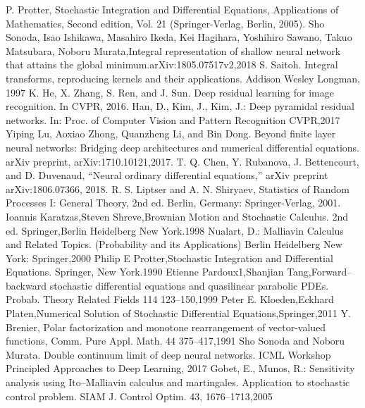 \documentclass{jsarticle}
\begin{document}
\begin{thebibliography}{99}
    P. Protter, Stochastic Integration and Differential Equations, Applications of Mathematics, Second edition, Vol. 21 (Springer-Verlag, Berlin, 2005).
     Sho Sonoda, Isao Ishikawa, Masahiro Ikeda, Kei Hagihara, Yoshihiro Sawano, Takuo Matsubara, Noboru Murata,Integral representation of shallow neural network that attains the global minimum.arXiv:1805.07517v2,2018
     S. Saitoh. Integral transforms, reproducing kernels and their applications. Addison Wesley Longman, 1997
      K. He, X. Zhang, S. Ren, and J. Sun. Deep residual learning
for image recognition. In CVPR, 2016.
   Han, D., Kim, J., Kim, J.: Deep pyramidal residual networks. In: Proc. of Computer Vision and Pattern Recognition CVPR,2017 
     Yiping Lu, Aoxiao Zhong, Quanzheng Li, and Bin Dong. Beyond finite layer neural networks: Bridging deep architectures and numerical differential equations. arXiv preprint, arXiv:1710.10121,2017.  
   T. Q. Chen, Y. Rubanova, J. Bettencourt, and D. Duvenaud, “Neural ordinary differential equations,” arXiv preprint arXiv:1806.07366, 2018.
      R. S. Liptser and A. N. Shiryaev, Statistics of Random Processes I: General Theory, 2nd ed. Berlin, Germany: Springer-Verlag, 2001.
   Ioannis Karatzas,Steven Shreve,Brownian Motion and Stochastic Calculus. 2nd ed. Springer,Berlin Heidelberg New York.1998
      Nualart, D.: Malliavin Calculus and Related Topics. (Probability and its Applications) Berlin Heidelberg New York: Springer,2000
        Philip E Protter,Stochastic Integration and Differential Equations. Springer, New York.1990
       Etienne Pardoux1,Shanjian Tang,Forward–backward stochastic differential equations and quasilinear parabolic PDEs. Probab. Theory Related Fields 114 123–150,1999  
        Peter E. Kloeden,Eckhard Platen,Numerical Solution
of Stochastic Differential Equations,Springer,2011  
    Y. Brenier, Polar factorization and monotone rearrangement of vector-valued functions, Comm. Pure Appl. Math. 44 375–417,1991
     Sho Sonoda and Noboru Murata. Double continuum limit of deep neural networks. ICML Workshop Principled Approaches to Deep Learning, 2017
      Gobet, E., Munos, R.: Sensitivity analysis using Ito–Malliavin calculus and martingales. Application to stochastic control problem. SIAM J. Control Optim. 43, 1676–1713,2005
\end{thebibliography}
\end{document}

